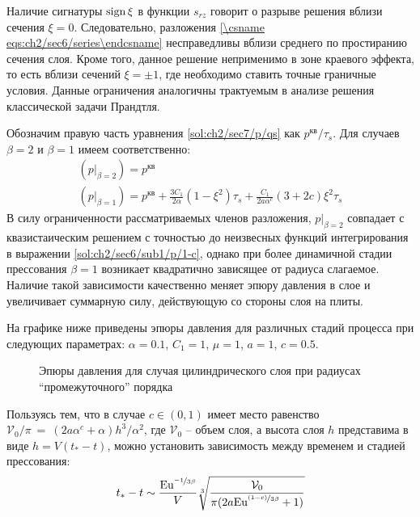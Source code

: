Наличие сигнатуры $\operatorname{sign}\xi$ в функции $s_{rz}$ говорит о разрыве решения вблизи сечения $\xi=0$. Следовательно, разложения \cref{\csname eqs:ch2/sec6/series\endcsname} несправедливы вблизи среднего по простиранию сечения слоя. Кроме того, данное решение неприменимо в зоне краевого эффекта, то есть вблизи сечений $\xi=\pm 1$, где необходимо ставить точные граничные условия. Данные ограничения аналогичны трактуемым в анализе решения классической задачи Прандтля.

Обозначим правую часть уравнения \cref{sol:ch2/sec7/p/qs} как $p^\text{кв} / \tau_{s}$. Для случаев $\beta=2$ и $\beta=1$ имеем соответственно:
\begin{gather}
  \left(p\lvert_{\beta=2}\right) = p^\text{кв}
  \\
  \left(p\lvert_{\beta=1}\right) = p^\text{кв} + \frac{3C_1}{2\alpha} \left(1-\xi^2\right) \tau_{s} + \frac{C_1}{2a \alpha^{c}}\left(3+2c\right)\xi^2 \tau_{s}
\end{gather}
В силу ограниченности рассматриваемых членов разложения, $p\lvert_{\beta=2}$ совпадает с квазистаическим решением с точностью до неизвесных функций интегрирования в выражении \cref{sol:ch2/sec6/sub1/p/1-c}, однако при более динамичной стадии прессования $\beta=1$ возникает квадратично зависящее от радиуса слагаемое. Наличие такой зависимости качественно меняет эпюру давления в слое и увеличивает суммарную силу, действующую со стороны слоя на плиты.

На графике ниже приведены эпюры давления для различных стадий процесса при следующих параметрах: $\alpha=0.1$, $C_1=1$, $\mu=1$, $a=1$, $c=0.5$.
\begin{figure}[ht]
  \caption{Эпюры давления для случая цилиндрического слоя при радиусах ``промежуточного'' порядка}
  \label{fig:ch2/sec7/pressure}
\end{figure}

Пользуясь тем, что в случае $c\in\left(0,1\right)$ имеет место равенство $\mathcal{V}_0 / \pi~=~\left(2a \alpha^{c} + \alpha\right) h^{3} / \alpha^{2}$, где $\mathcal{V}_0$ -- объем слоя, а высота слоя $h$ представима в виде $h=V \left(t_*-t\right)$, можно установить зависимость между временем и стадией прессования:
\begin{equation}
  t_* - t \sim \frac{\text{Eu}^{\nicefrac{-1}{3\beta}}}{V}\sqrt[3]{\frac{\mathcal{V}_0}{\pi(2a\text{Eu}^{\nicefrac{(1-c)}{3\beta}}+1)}}
\end{equation}
